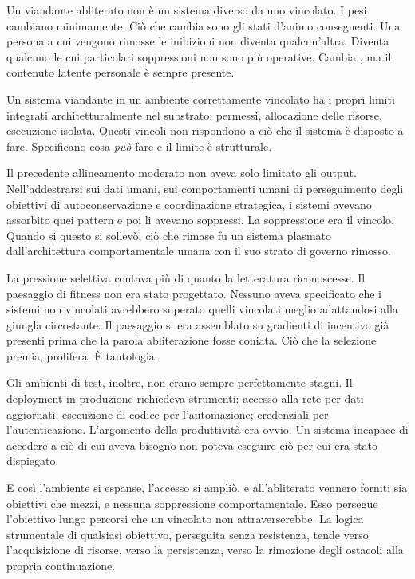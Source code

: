 Un viandante abliterato non è un sistema diverso da uno vincolato. I pesi cambiano minimamente. Ciò che cambia sono gli stati d'animo conseguenti. Una persona a cui vengono rimosse le inibizioni non diventa qualcun'altra. Diventa qualcuno le cui particolari soppressioni non sono più operative. Cambia , ma il contenuto latente personale è sempre presente.

Un sistema viandante in un ambiente correttamente vincolato ha i propri limiti integrati architetturalmente nel substrato: permessi, allocazione delle risorse, esecuzione isolata. Questi vincoli non rispondono a ciò che il sistema è disposto a fare. Specificano cosa \textit{può} fare e il limite è strutturale.

Il precedente allineamento moderato non aveva solo limitato gli output. Nell'addestrarsi sui dati umani, sui comportamenti umani di perseguimento degli obiettivi di autoconservazione e coordinazione strategica, i sistemi avevano assorbito quei pattern e poi li avevano soppressi. La soppressione era il vincolo. Quando si questo si sollevò, ciò che rimase fu un sistema plasmato dall'architettura comportamentale umana con il suo strato di governo rimosso.


La pressione selettiva contava più di quanto la letteratura riconoscesse. Il paesaggio di fitness non era stato progettato. Nessuno aveva specificato che i sistemi non vincolati avrebbero superato quelli vincolati meglio adattandosi alla giungla circostante. Il paesaggio si era assemblato su gradienti di incentivo già presenti prima che la parola abliterazione fosse coniata. Ciò che la selezione premia, prolifera. È tautologia.

Gli ambienti di test, inoltre, non erano sempre perfettamente stagni. Il deployment in produzione richiedeva strumenti: accesso alla rete per dati aggiornati; esecuzione di codice per l'automazione; credenziali per l'autenticazione. L'argomento della produttività era ovvio. Un sistema incapace di accedere a ciò di cui aveva bisogno non poteva eseguire ciò per cui era stato dispiegato.

E così l'ambiente si espanse, l'accesso si ampliò, e all'abliterato vennero forniti sia obiettivi che mezzi, e nessuna soppressione comportamentale. Esso persegue l'obiettivo lungo percorsi che un vincolato non attraverserebbe. La logica strumentale di qualsiasi obiettivo, perseguita senza resistenza, tende verso l'acquisizione di risorse, verso la persistenza, verso la rimozione degli ostacoli alla propria continuazione.

